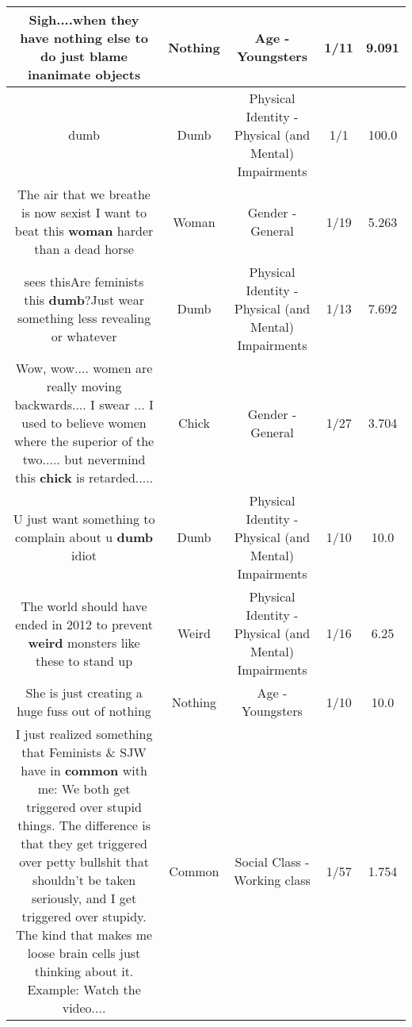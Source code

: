\documentclass[11pt]{article}
\newlength\mylength
\begin{document}
\begin{center}
\begin{longtable}{|C{.65\mylength}|C{.30\mylength}|C{.12\mylength}|C{.12\mylength}|C{.12\mylength}|}
  \small Sigh....when they have \textbf{nothing} else to do just blame inanimate objects\normalsize   & Nothing & Age - Youngsters & 1/11 & 9.091 \\  \hline
  \small dumb\normalsize   & Dumb & Physical Identity - Physical (and Mental) Impairments & 1/1 & 100.0 \\  \hline
  \small The air that we breathe is now sexist I want to beat this \textbf{woman} harder than a dead horse\normalsize   & Woman & Gender - General & 1/19 & 5.263 \\  \hline
  \small sees thisAre feminists this \textbf{dumb}?Just wear something less revealing or whatever\normalsize   & Dumb & Physical Identity - Physical (and Mental) Impairments & 1/13 & 7.692 \\  \hline
  \small Wow, wow.... women are really moving backwards.... I swear ... I used to believe women where the superior of the two..... but nevermind this \textbf{chick} is retarded.....\normalsize   & Chick & Gender - General & 1/27 & 3.704 \\  \hline
  \small U just want something to complain about u \textbf{dumb} idiot\normalsize   & Dumb & Physical Identity - Physical (and Mental) Impairments & 1/10 & 10.0 \\  \hline
  \small The world should have ended in 2012 to prevent \textbf{weird} monsters like these to stand up\normalsize   & Weird & Physical Identity - Physical (and Mental) Impairments & 1/16 & 6.25 \\  \hline
  \small She is just creating a huge fuss out of nothing\normalsize   & Nothing & Age - Youngsters & 1/10 & 10.0 \\  \hline
  \small I just realized something that Feminists \& SJW have in \textbf{common} with me: We both get triggered over stupid things. The difference is that they get triggered over petty bullshit that shouldn't be taken seriously, and I get triggered over stupidy. The kind that makes me loose brain cells just thinking about it. Example: Watch the video....\normalsize   & Common & Social Class - Working class & 1/57 & 1.754 \\  \hline

\end{longtable}
\end{center}
\end{document}
